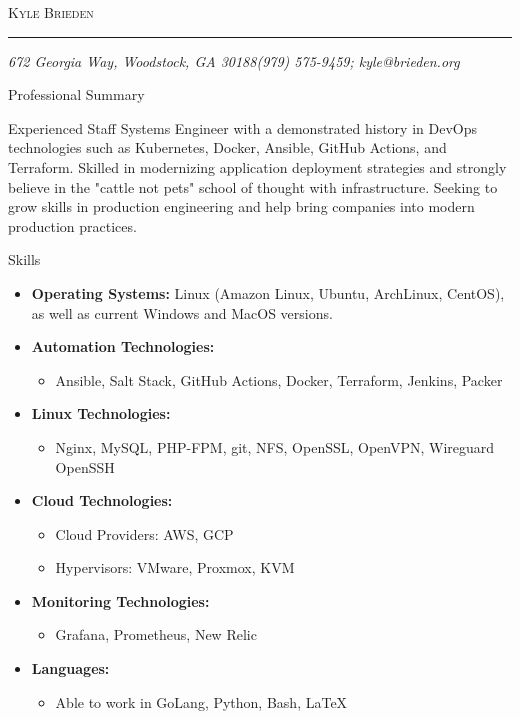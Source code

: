 \documentclass[10pt,oneside]{article}
\makeatletter
\newcommand{\name}{Kyle Brieden}
\newcommand{\addr}{672 Georgia Way, Woodstock, GA 30188}
\newcommand{\phone}{(979) 575-9459}
\newcommand{\email}{kyle@brieden.org}
\newcommand{\bigname}[1]{
    \begin{center}\fontfamily{phv}\selectfont\Huge\scshape#1\end{center}
}
\newenvironment{ressection}[1]{
    \vspace{4pt}
    {\fontfamily{phv}\selectfont\Large#1}
    \begin{itemize}
    \vspace{3pt}
}{
    \end{itemize}
}
\newcommand{\resitem}[1]{
    \vspace{-4pt}
    \item \begin{flushleft} #1 \end{flushleft}
}
\newcommand{\ressubitem}[1]{
    \vspace{-1pt}
    \item \begin{flushleft} #1 \end{flushleft}
}
\newenvironment{reslist}[1]{
    \resitem{\textbf{#1}}
    \vspace{-5pt}
    \begin{itemize}
}{
    \end{itemize}
}
\makeatother
\begin{document}
 \selectfont

\bigname{\name}

\vspace{-8pt} \rule{\textwidth}{1pt}

\vspace{-1pt} {\small\itshape \addr \hfill \phone; \email}

\vspace{8 pt}




\begin{ressection}{Professional Summary}

    \begin{resobj}{Experienced Staff Systems Engineer with a demonstrated history in DevOps technologies such as Kubernetes, Docker, Ansible, GitHub Actions, and Terraform.  Skilled in modernizing application deployment strategies and strongly believe in the "cattle not pets" school of thought with infrastructure.  Seeking to grow skills in production engineering and help bring companies into modern production practices.}
   \end{resobj}

\end{ressection}
\begin{ressection}{Skills}

    \resitem{\textbf{Operating Systems:} Linux (Amazon Linux, Ubuntu, ArchLinux, CentOS), as well as current Windows and MacOS versions.}

    \begin{reslist}{Automation Technologies:}
        \ressubitem{Ansible, Salt Stack, GitHub Actions, Docker, Terraform, Jenkins, Packer}
    \end{reslist}

    \begin{reslist}{Linux Technologies:}
        \ressubitem{Nginx, MySQL, PHP-FPM, git, NFS, OpenSSL, OpenVPN, Wireguard OpenSSH}
    \end{reslist}

    \begin{reslist}{Cloud Technologies:}
		\ressubitem{Cloud Providers:  AWS, GCP}
        \ressubitem{Hypervisors:  VMware, Proxmox, KVM}
    \end{reslist}

    \begin{reslist}{Monitoring Technologies:}
        \ressubitem{Grafana, Prometheus, New Relic}
    \end{reslist}

    \begin{reslist}{Languages:}
        \ressubitem{Able to work in GoLang, Python, Bash, \LaTeX\ }
    \end{reslist}

\end{ressection}
\end{document}
